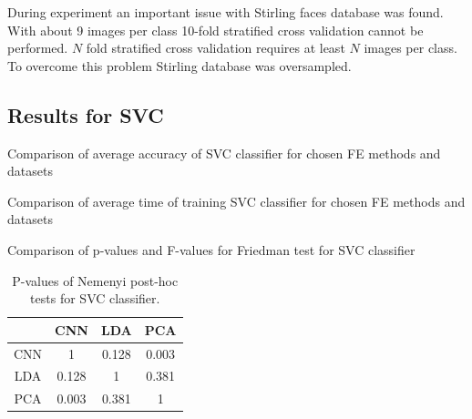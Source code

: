 \documentclass[a4paper, 10 pt, journal]{ieeeconf}
\begin{document}
During experiment an important issue with Stirling faces database was found. With about 9 images per class 10-fold stratified cross validation cannot be performed. $N$ fold stratified cross validation requires at least $N$ images per class. To overcome this problem Stirling database was oversampled.

\subsection{Results for SVC}


\begin{table}[!h]
    \centering
    \caption{Comparison of average accuracy of SVC classifier for chosen FE methods and datasets}
    
    \label{table:svm_acc_comparison}
\end{table}

\begin{table}[!h]
    \centering
    \caption{Comparison of average time of training SVC classifier for chosen FE methods and datasets}
    
    \label{table:svm_fit_time_comparison}
\end{table}

\begin{table}[!h]
    \centering
    \caption{Comparison of p-values and F-values for Friedman test for SVC classifier}
    
    \label{table:svm_pvalues}
\end{table}

\begin{table}[!h]
    \centering
    \caption{P-values of Nemenyi post-hoc tests for SVC classifier.}
    \begin{tabular}{|c|c|c|c|}
         \hline
          \rowcolor{Gray}
          & CNN & LDA & PCA \\
         \hline
         CNN &  1 &  0.128 &  0.003 \\
         \hline
         LDA &  0.128 & 1 &  0.381 \\
         \hline
         PCA &  0.003 & 0.381 & 1 \\
         \hline
    \end{tabular}
    \label{tab:svm_posthoc_pvalues}
\end{table}
\end{document}
